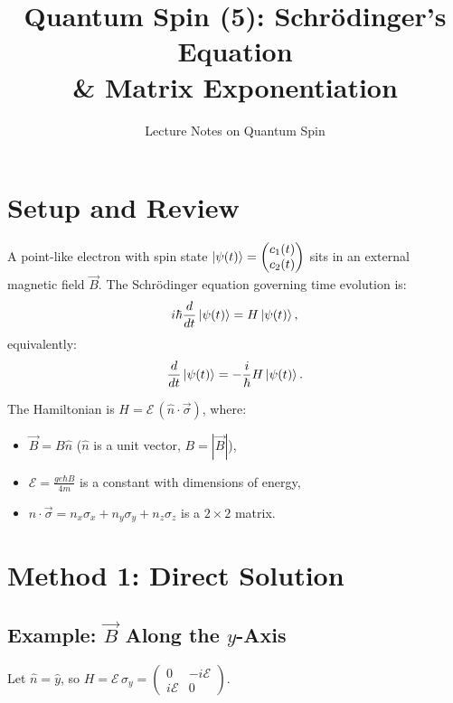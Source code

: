 \documentclass[11pt,a4paper]{article}
\title{\textbf{Quantum Spin (5): Schr\"odinger's Equation \\ \& Matrix Exponentiation}}
\author{Lecture Notes on Quantum Spin}
\date{}
\theoremstyle{definition}
\theoremstyle{plain}
\theoremstyle{remark}
\begin{document}
\maketitle
\tableofcontents
\newpage

\section{Setup and Review}

A point-like electron with spin state $\ket{\psi(t)} = \begin{pmatrix}c_1(t)\\c_2(t)\end{pmatrix}$ sits in an external magnetic field $\vec{B}$. The Schr\"odinger equation governing time evolution is:
\[
    i\hbar\frac{d}{dt}\ket{\psi(t)} = H\ket{\psi(t)},
\]
equivalently:
\[
    \frac{d}{dt}\ket{\psi(t)} = -\frac{i}{\hbar}H\ket{\psi(t)}.
\]

The Hamiltonian is $H = \mathcal{E}\,(\hat{n}\cdot\vec{\sigma})$, where:
\begin{itemize}
    \item $\vec{B} = B\hat{n}$ ($\hat{n}$ is a unit vector, $B = |\vec{B}|$),
    \item $\mathcal{E} = \frac{ge\hbar B}{4m}$ is a constant with dimensions of energy,
    \item $\hat{n}\cdot\vec{\sigma} = n_x\sigma_x + n_y\sigma_y + n_z\sigma_z$ is a $2\times 2$ matrix.
\end{itemize}

\section{Method 1: Direct Solution}

\subsection{Example: $\vec{B}$ Along the $y$-Axis}

Let $\hat{n} = \hat{y}$, so $H = \mathcal{E}\,\sigma_y = \begin{pmatrix}0 & -i\mathcal{E} \\ i\mathcal{E} & 0\end{pmatrix}$.
\end{document}
